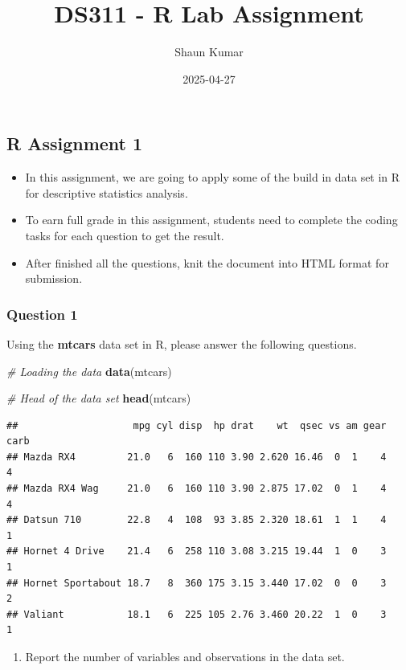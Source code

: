 \documentclass[
]{article}
\title{DS311 - R Lab Assignment}
\author{Shaun Kumar}
\date{2025-04-27}
\newenvironment{Shaded}{\begin{snugshade}}{\end{snugshade}}
\newcommand{\CommentTok}[1]{\textcolor[rgb]{0.56,0.35,0.01}{\textit{#1}}}
\newcommand{\FunctionTok}[1]{\textcolor[rgb]{0.13,0.29,0.53}{\textbf{#1}}}
\newcommand{\NormalTok}[1]{#1}
\providecommand{\tightlist}{%
  \setlength{\itemsep}{0pt}\setlength{\parskip}{0pt}}
\begin{document}
\maketitle

\subsection{R Assignment 1}\label{r-assignment-1}

\begin{itemize}
\tightlist
\item
  In this assignment, we are going to apply some of the build in data
  set in R for descriptive statistics analysis.
\item
  To earn full grade in this assignment, students need to complete the
  coding tasks for each question to get the result.
\item
  After finished all the questions, knit the document into HTML format
  for submission.
\end{itemize}

\subsubsection{Question 1}\label{question-1}

Using the \textbf{mtcars} data set in R, please answer the following
questions.

\begin{Shaded}
\begin{Highlighting}[]
\CommentTok{\# Loading the data}
\FunctionTok{data}\NormalTok{(mtcars)}

\CommentTok{\# Head of the data set}
\FunctionTok{head}\NormalTok{(mtcars)}
\end{Highlighting}
\end{Shaded}

\begin{verbatim}
##                    mpg cyl disp  hp drat    wt  qsec vs am gear carb
## Mazda RX4         21.0   6  160 110 3.90 2.620 16.46  0  1    4    4
## Mazda RX4 Wag     21.0   6  160 110 3.90 2.875 17.02  0  1    4    4
## Datsun 710        22.8   4  108  93 3.85 2.320 18.61  1  1    4    1
## Hornet 4 Drive    21.4   6  258 110 3.08 3.215 19.44  1  0    3    1
## Hornet Sportabout 18.7   8  360 175 3.15 3.440 17.02  0  0    3    2
## Valiant           18.1   6  225 105 2.76 3.460 20.22  1  0    3    1
\end{verbatim}

\begin{enumerate}
\def\labelenumi{\alph{enumi}.}
\tightlist
\item
  Report the number of variables and observations in the data set.
\end{enumerate}
\end{document}
